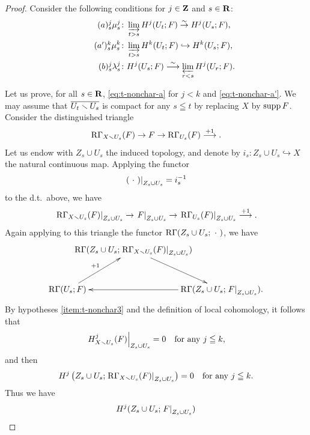 \begin{proof}
  Consider the following conditions for 
  \(j\in\zz\) and \(s\in\rr\):
  \begin{align}
      \tag*{\((a)^j_s\)}\label{eq:t-nonchar-a}
      \mu_{s}^{j}&\colon
      \indlim[t>s] H^{j}(U_t;F) \simar H^{j}(U_s;F),\\
      \tag*{\((a')^k_s\)}\label{eq:t-nonchar-a'}
      \mu_{s}^{k}&\colon
      \indlim[t>s] H^{k}(U_t;F) \hookrightarrow H^{k}(U_s;F),\\
      \tag*{\((b)^j_s\)}\label{eq:t-nonchar-b}
      \lambda_{s}^{j}&\colon
      H^{j}(U_s;F)\simarr \prolim[r<s] H^{j}(U_r;F).
  \end{align}

  Let us prove, 
  for all \(s\in \rr\), 
  \ref{eq:t-nonchar-a} for \(j<k\) and \ref{eq:t-nonchar-a'}. 
  We may assume that \(\overline{U_{t}\smi U_{s}}\) is compact 
  for any \(s\leqq t\) by replacing \(X\) by \(\supp{F}\). 
  Consider the distinguished triangle\[
    \RG_{X\smi U_{s}}(F)
    \to
    F
    \to
    \RG_{U_{s}}(F)
    \overset{+1}{\longrightarrow}.
  \]
  Let us endow with \(Z_{s}\cup U_{s}\) the induced topology, and
  denote by \(
    i_{s}\colon Z_{s}\cup U_{s}\hookrightarrow X
  \) the natural continuous map.  
  Applying the functor \[
    \mres[(\blk)]{Z_{s}\cup U_{s}}=i_{s}^{-1}
  \] to the d.t.~above, we have \[
    \mres[\RG_{X\smi U_{s}}(F)]{Z_{s}\cup U_{s}}  
    \to
    \mres[F]{Z_{s}\cup U_{s}}  
    \to
    \mres[\RG_{U_{s}}(F)]{Z_{s}\cup U_{s}}  
    \overset{+1}{\longrightarrow}.
  \]
  Again applying to this triangle the functor \(\RG(Z_{s}\cup U_{s};\blk)\), 
  we have
  \begin{equation}
    \vcenter{\xymatrix@C=-20pt@R=30pt{
      &
      \RG(Z_{s}\cup U_{s};
      \mres[\RG_{X\smi U_{s}}(F)]{Z_{s}\cup U_{s}})
      \ar[rd]
      &
      \\
      \RG(U_{s};F)
      \ar[ru]^-{+1}
      &&
      \RG(Z_{s}\cup U_{s};\mres[F]{Z_{s}\cup U_{s}}).
      \ar[ll]
    }}
  \end{equation}
  By hypotheses \eqref{item:t-nonchar3} and 
  the definition of local cohomology, 
  it follows that
  \[
    \mres[H^{j}_{X\smi U_{s}}(F)]{Z_{s}\cup U_{s}}=0
    \quad
    \text{for any \(j\leqq k\),}
  \]
  and then \[
    H^{j}\left(Z_{s}\cup U_{s};
      \mres[\RG_{X\smi U_{s}}(F)]{Z_{s}\cup U_{s}}
    \right)=0
    \quad
    \text{for any \(j\leqq k\).}
  \]
  Thus we have
  \begin{align}
    \label{eq:a-iso}H^{j}(Z_{s}\cup U_{s};\mres[F]{Z_{s}\cup U_{s}})

\end{align}
\end{proof}
